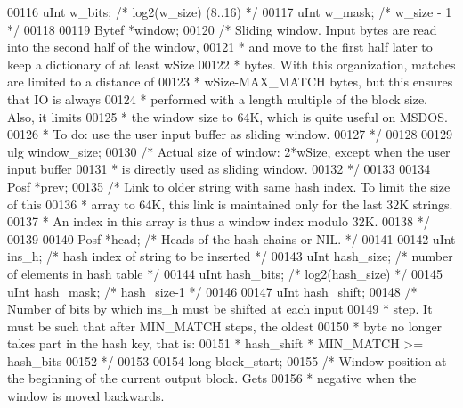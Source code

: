 \begin{DoxyCode}
00116     uInt  w\_bits;        \textcolor{comment}{/* log2(w\_size)  (8..16) */}
00117     uInt  w\_mask;        \textcolor{comment}{/* w\_size - 1 */}
00118 
00119     Bytef *window;
00120     \textcolor{comment}{/* Sliding window. Input bytes are read into the second half of the window,}
00121 \textcolor{comment}{     * and move to the first half later to keep a dictionary of at least wSize}
00122 \textcolor{comment}{     * bytes. With this organization, matches are limited to a distance of}
00123 \textcolor{comment}{     * wSize-MAX\_MATCH bytes, but this ensures that IO is always}
00124 \textcolor{comment}{     * performed with a length multiple of the block size. Also, it limits}
00125 \textcolor{comment}{     * the window size to 64K, which is quite useful on MSDOS.}
00126 \textcolor{comment}{     * To do: use the user input buffer as sliding window.}
00127 \textcolor{comment}{     */}
00128 
00129     ulg window\_size;
00130     \textcolor{comment}{/* Actual size of window: 2*wSize, except when the user input buffer}
00131 \textcolor{comment}{     * is directly used as sliding window.}
00132 \textcolor{comment}{     */}
00133 
00134     Posf *prev;
00135     \textcolor{comment}{/* Link to older string with same hash index. To limit the size of this}
00136 \textcolor{comment}{     * array to 64K, this link is maintained only for the last 32K strings.}
00137 \textcolor{comment}{     * An index in this array is thus a window index modulo 32K.}
00138 \textcolor{comment}{     */}
00139 
00140     Posf *head; \textcolor{comment}{/* Heads of the hash chains or NIL. */}
00141 
00142     uInt  ins\_h;          \textcolor{comment}{/* hash index of string to be inserted */}
00143     uInt  hash\_size;      \textcolor{comment}{/* number of elements in hash table */}
00144     uInt  hash\_bits;      \textcolor{comment}{/* log2(hash\_size) */}
00145     uInt  hash\_mask;      \textcolor{comment}{/* hash\_size-1 */}
00146 
00147     uInt  hash\_shift;
00148     \textcolor{comment}{/* Number of bits by which ins\_h must be shifted at each input}
00149 \textcolor{comment}{     * step. It must be such that after MIN\_MATCH steps, the oldest}
00150 \textcolor{comment}{     * byte no longer takes part in the hash key, that is:}
00151 \textcolor{comment}{     *   hash\_shift * MIN\_MATCH >= hash\_bits}
00152 \textcolor{comment}{     */}
00153 
00154     \textcolor{keywordtype}{long} block\_start;
00155     \textcolor{comment}{/* Window position at the beginning of the current output block. Gets}
00156 \textcolor{comment}{     * negative when the window is moved backwards.}

\end{DoxyCode}
